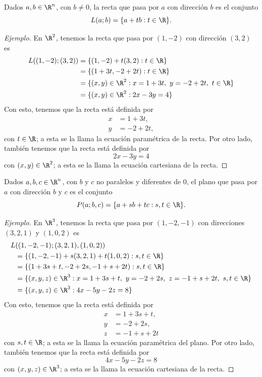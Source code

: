 \documentclass[a4,11pt]{aleph-notas}
\begin{document}
\begin{defi}[Recta de $\R^n$]
    Dados $a,b\in\R^n$, con $b\neq0$, la recta que pasa por $a$ con dirección $b$ es el conjunto
    \[
        L(a;b)=\{a+t b:t\in\R\}.
    \]
\end{defi}

\begin{proof}[Ejemplo]
    En $\R^2$, tenemos la recta que pasa por $(1,-2)$ con dirección $(3,2)$ es
    \begin{align*}
        L((1,-2);(3,2)) 
            & = \{(1,-2)+t(3,2):t \in\R\} \\
            & = \{(1+3t ,-2+2t ): t \in\R\} \\
            & = \{(x,y)\in\R^2: x = 1+3t ,\ y=-2+2t ,\ t \in\R\} \\
            & = \{(x,y)\in\R^2: 2x-3y=4\}
    \end{align*}
    Con esto, tenemos que la recta está definida por
    \begin{align*}
        x& = 1+3t ,\\
        y& = -2+2t ,
    \end{align*}
    con $t \in \R$; a esta se la llama la ecuación paramétrica de la recta. Por otro lado, también tenemos que la recta está definida por 
    \[
        2x-3y=4
    \]
    con $(x,y)\in\R^2$; a esta se la llama la ecuación cartesiana de la recta.
\end{proof}

\begin{defi}[Plano de $\R^n$]
    Dados $a,b,c\in\R^n$, con $b$ y $c$ no paralelos y diferentes de $0$, el plano que pasa por $a$ con dirección $b$ y $c$ es el conjunto
    \[
        P(a;b,c)=\{a+s  b+t c:s ,t \in\R\}.
    \]
\end{defi}

\begin{proof}[Ejemplo]
    En $\R^3$, tenemos la recta que pasa por $(1,-2,-1)$ con direcciones $(3,2,1)$ y $(1,0,2)$ es
    \begin{align*}
        L&((1,-2,-1);(3,2,1),(1,0,2)) \\
            & = \{(1,-2,-1)+s (3,2,1) + t (1,0,2) :s ,t \in\R\} \\
            & = \{(1+3s +t ,-2+2s ,-1+s +2t ): s ,t \in\R\} \\
            & = \{(x,y,z)\in\R^3: x = 1+3s +t ,\ y=-2+2s ,\ z=-1+s +2t ,\ s ,t \in\R\} \\
            & = \{(x,y,z)\in\R^3: 4x-5y-2z=8\}
    \end{align*}
    Con esto, tenemos que la recta está definida por
    \begin{align*}
        x& = 1+3s +t ,\\
        y& = -2+2s ,\\
        z& = -1+s +2t 
    \end{align*}
    con $s ,t \in \R$; a esta se la llama la ecuación paramétrica del plano. Por otro lado, también tenemos que la recta está definida por 
    \[
        4x-5y-2z=8
    \]
    con $(x,y,z)\in\R^3$; a esta se la llama la ecuación cartesiana de la recta.
\end{proof}
\end{document}
